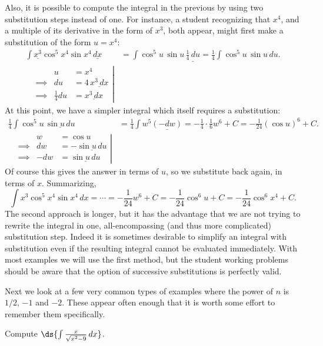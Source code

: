 Also, it is possible to compute the integral in the previous
by using two substitution steps instead of one.
For instance, a student recognizing that $x^4$, and a multiple
of its derivative in the form of $x^3$, both appear, might 
first make a substitution of the form $u=x^4$:
\begin{align*}
\int \underline{x^3}\cos^5x^4\sin x^4\,\underline{dx}&=
         \int\cos^5u\,\sin u\,\underline{\frac14\,du}
 =\frac14\int\cos^5u\,\sin u\,du.\\
\left.\begin{alignedat}{2}
&& u&=x^4\\
&\implies&du&=4\,\underline{x^3\,dx}\\
&\implies&\frac14du&=\underline{x^3\,dx}\end{alignedat}\right|&
\end{align*}
At this point, we have a simpler integral which itself requires a
substitution:
\begin{align*}
\frac14\int\cos^5u\,\underline{\sin u\,du}&=\frac14\int w^5\underline{(-dw)}
 =-\frac14\cdot\frac16 w^6+C=-\frac1{24}(\cos u)^6+C.\\
\left.\begin{alignedat}{2}
&&w&=\cos u\\
&\implies&dw&=-\underline{\sin u\,du}\\
&\implies&-dw&=\underline{\sin u\,du}\end{alignedat}\right|&\end{align*}
Of course this gives the answer in terms of $u$, so we substitute
back again, in terms of $x$.  Summarizing,
$$\int x^3\cos^5x^4\sin x^4\,dx=\cdots=
    -\frac1{24}w^6+C=-\frac1{24}\cos^6u+C
                =-\frac1{24}\cos^6x^4+C.$$
The second approach is longer, but it has the advantage that we
are not trying to rewrite the integral in one, all-encompassing
(and thus more complicated)
substitution step. Indeed it is sometimes desirable to simplify an 
integral with substitution even if the resulting integral cannot be 
evaluated immediately.  With most examples we will use the first
method, but the student working problems should be aware that
the option of successive substitutions is perfectly valid.

Next we look at a few very common types of examples where the
power of $n$ is $1/2$, $-1$ and $-2$.  These appear often enough that
it is worth some effort to remember them specifically.

\bex Compute $\ds{\int\frac{x}{\sqrt{x^2-9}}\,dx}$.

